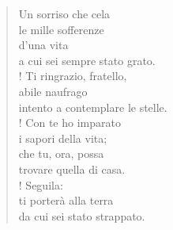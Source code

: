 
\begin{verse}
    Un sorriso che cela\\
    le mille sofferenze\\
    d'una vita\\
    a cui sei sempre stato grato.\\!
    Ti ringrazio, fratello,\\
    abile naufrago\\
    intento a contemplare le stelle.\\!
    Con te ho imparato\\
    i sapori della vita;\\
    che tu, ora, possa\\
    trovare quella di casa.\\!
    Seguila:\\
    ti porterà alla terra\\
    da cui sei stato strappato.   
    
\end{verse}